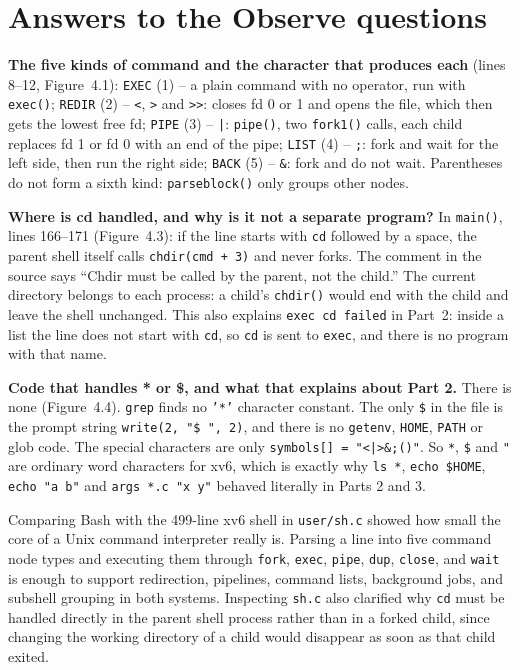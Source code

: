 \documentclass{assets/utmreport}
\begin{document}
\section{Answers to the Observe questions}
\begin{utmenumerate}
\item \textbf{The five kinds of command and the character that produces each} (lines 8--12, Figure~4.1):
\texttt{EXEC} (1) -- a plain command with no operator, run with \texttt{exec()};
\texttt{REDIR} (2) -- \texttt{<}, \texttt{>} and \texttt{>>}: closes fd 0 or 1 and opens the file, which then gets the lowest free fd;
\texttt{PIPE} (3) -- \texttt{|}: \texttt{pipe()}, two \texttt{fork1()} calls, each child replaces fd 1 or fd 0 with an end of the pipe;
\texttt{LIST} (4) -- \texttt{;}: fork and wait for the left side, then run the right side;
\texttt{BACK} (5) -- \texttt{\&}: fork and do not wait.
Parentheses do not form a sixth kind: \texttt{parseblock()} only groups other nodes.
\item \textbf{Where is cd handled, and why is it not a separate program?} In \texttt{main()}, lines 166--171 (Figure~4.3): if the line starts with \texttt{cd} followed by a space, the parent shell itself calls \texttt{chdir(cmd + 3)} and never forks. The comment in the source says ``Chdir must be called by the parent, not the child.'' The current directory belongs to each process: a child's \texttt{chdir()} would end with the child and leave the shell unchanged. This also explains \texttt{exec cd failed} in Part~2: inside a list the line does not start with \texttt{cd}, so \texttt{cd} is sent to \texttt{exec}, and there is no program with that name.
\item \textbf{Code that handles * or \$, and what that explains about Part 2.} There is none (Figure~4.4). \texttt{grep} finds no \texttt{'*'} character constant. The only \texttt{\$} in the file is the prompt string \texttt{write(2, "\$ ", 2)}, and there is no \texttt{getenv}, \texttt{HOME}, \texttt{PATH} or glob code. The special characters are only \texttt{symbols[] = "<|>\&;()"}. So \texttt{*}, \texttt{\$} and \texttt{"} are ordinary word characters for xv6, which is exactly why \texttt{ls *}, \texttt{echo \$HOME}, \texttt{echo "a b"} and \texttt{args *.c "x y"} behaved literally in Parts 2 and 3.
\end{utmenumerate}

\utmconclusions
Comparing Bash with the 499-line xv6 shell in \texttt{user/sh.c} showed how small the core of a Unix command interpreter really is. Parsing a line into five command node types and executing them through \texttt{fork}, \texttt{exec}, \texttt{pipe}, \texttt{dup}, \texttt{close}, and \texttt{wait} is enough to support redirection, pipelines, command lists, background jobs, and subshell grouping in both systems. Inspecting \texttt{sh.c} also clarified why \texttt{cd} must be handled directly in the parent shell process rather than in a forked child, since changing the working directory of a child would disappear as soon as that child exited.
\end{document}
